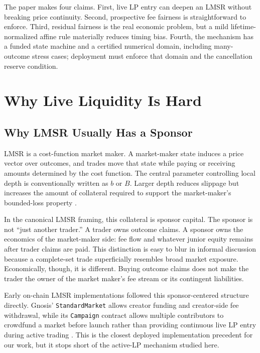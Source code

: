 \documentclass[10pt]{article}
\begin{document}
The paper makes four claims. First, live LP entry can deepen an LMSR without breaking price continuity. Second, prospective fee fairness is straightforward to enforce. Third, residual fairness is the real economic problem, but a mild lifetime-normalized affine rule materially reduces timing bias. Fourth, the mechanism has a funded state machine and a certified numerical domain, including many-outcome stress cases; deployment must enforce that domain and the cancellation reserve condition.

\section{Why Live Liquidity Is Hard}

\subsection{Why LMSR Usually Has a Sponsor}

LMSR is a cost-function market maker. A market-maker state induces a price vector over outcomes, and trades move that state while paying or receiving amounts determined by the cost function. The central parameter controlling local depth is conventionally written as $b$ or $B$. Larger depth reduces slippage but increases the amount of collateral required to support the market-maker's bounded-loss property \cite{hanson2002,chenpennock2007,abernethychenvaughan2013,gnosislmsr}.

In the canonical LMSR framing, this collateral is sponsor capital. The sponsor is not ``just another trader.'' A trader owns outcome claims. A sponsor owns the economics of the market-maker side: fee flow and whatever junior equity remains after trader claims are paid. This distinction is easy to blur in informal discussion because a complete-set trade superficially resembles broad market exposure. Economically, though, it is different. Buying outcome claims does not make the trader the owner of the market maker's fee stream or its contingent liabilities.

Early on-chain LMSR implementations followed this sponsor-centered structure directly. Gnosis' \texttt{StandardMarket} allows creator funding and creator-side fee withdrawal, while its \texttt{Campaign} contract allows multiple contributors to crowdfund a market before launch rather than providing continuous live LP entry during active trading \cite{gnosisstandard,gnosiscampaign}. This is the closest deployed implementation precedent for our work, but it stops short of the active-LP mechanism studied here.
\end{document}
